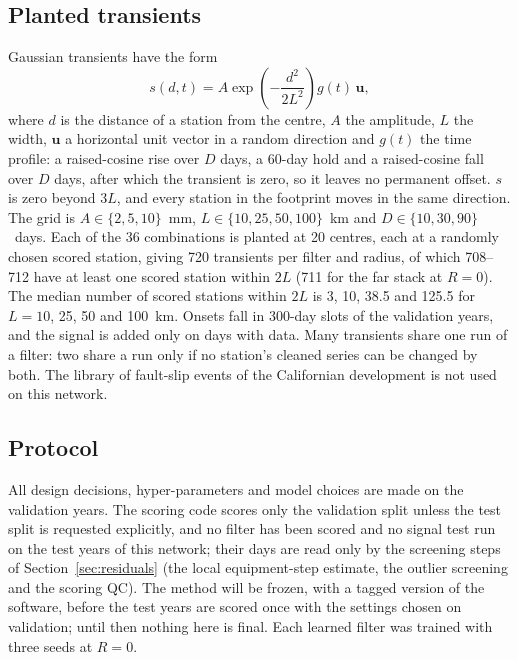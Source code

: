 \documentclass[preprint,12pt,authoryear]{elsarticle}
\begin{document}
\subsection{Planted transients}
\label{sec:planted}

Gaussian transients have the form
\begin{equation}
  s(d, t) = A \exp\!\left(-\frac{d^2}{2L^2}\right) g(t)\, \mathbf{u},
  \label{eq:gaussian}
\end{equation}
where $d$ is the distance of a station from the centre, $A$ the amplitude, $L$ the width, $\mathbf{u}$ a horizontal unit vector in a random direction and $g(t)$ the time profile: a raised-cosine rise over $D$ days, a 60-day hold and a raised-cosine fall over $D$ days, after which the transient is zero, so it leaves no permanent offset. $s$ is zero beyond $3L$, and every station in the footprint moves in the same direction. The grid is $A \in \{2, 5, 10\}$~mm, $L \in \{10, 25, 50, 100\}$~km and $D \in \{10, 30, 90\}$~days. Each of the 36 combinations is planted at 20 centres, each at a randomly chosen scored station, giving 720 transients per filter and radius, of which 708--712 have at least one scored station within $2L$ (711 for the far stack at $R = 0$). The median number of scored stations within $2L$ is 3, 10, 38.5 and 125.5 for $L = 10$, 25, 50 and 100~km. Onsets fall in 300-day slots of the validation years, and the signal is added only on days with data. Many transients share one run of a filter: two share a run only if no station's cleaned series can be changed by both. The library of fault-slip events of the Californian development is not used on this network.

\subsection{Protocol}
\label{sec:protocol}

All design decisions, hyper-parameters and model choices are made on the validation years. The scoring code scores only the validation split unless the test split is requested explicitly, and no filter has been scored and no signal test run on the test years of this network; their days are read only by the screening steps of Section~\ref{sec:residuals} (the local equipment-step estimate, the outlier screening and the scoring QC). The method will be frozen, with a tagged version of the software, before the test years are scored once with the settings chosen on validation; until then nothing here is final. Each learned filter was trained with three seeds at $R = 0$.
\end{document}
